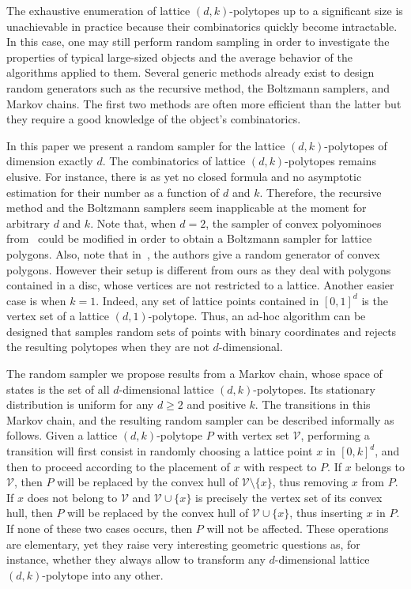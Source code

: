 \documentclass[a4paper]{article}
\begin{document}
The exhaustive enumeration of lattice $(d,k)$-polytopes up to a significant size is unachievable in practice because their combinatorics quickly become intractable. In this case, one may still perform random sampling in order to investigate the properties of typical large-sized objects and the average behavior of the algorithms applied to them. Several generic methods already exist to design random generators such as the recursive method, the Boltzmann samplers, and Markov chains. The first two methods are often more efficient than the latter but they require a good knowledge of the object's combinatorics.

In this paper we present a random sampler for the lattice $(d,k)$-polytopes of dimension exactly $d$. The combinatorics of lattice $(d,k)$-polytopes remains elusive. For instance, there is as yet no closed formula and no asymptotic estimation for their number as a function of $d$ and $k$. Therefore, the recursive method and the Boltzmann samplers seem inapplicable at the moment for arbitrary $d$ and $k$. Note that, when $d=2$, the sampler of convex polyominoes from~\cite{bodini2013asymptotic} could be modified in order to obtain a Boltzmann sampler for lattice polygons. Also, note that in~\cite{devillers2014generator}, the authors give a random generator of convex polygons. However their setup is different from ours as they deal with polygons contained in a disc, whose vertices are not restricted to a lattice. Another easier case is when $k=1$. Indeed, any set of lattice points contained in $[0,1]^d$ is the vertex set of a lattice $(d,1)$-polytope. Thus, an ad-hoc algorithm can be designed that samples random sets of points with binary coordinates and rejects the resulting polytopes when they are not $d$-dimensional.

The random sampler we propose results from a Markov chain, whose space of states is the set of all $d$-dimensional lattice $(d,k)$-polytopes. Its stationary distribution is uniform for any $d\geq{2}$ and positive $k$. The transitions in this Markov chain, and the resulting random sampler can be described informally as follows. Given a lattice $(d,k)$-polytope $P$ with vertex set $\mathcal{V}$, performing a transition will first consist in randomly choosing a lattice point $x$ in $[0,k]^d$, and then to proceed according to the placement of $x$ with respect to $P$. If $x$ belongs to $\mathcal{V}$, then $P$ will be replaced by the convex hull of $\mathcal{V}\mathord{\setminus}\{x\}$, thus removing $x$ from $P$. If $x$ does not belong to $\mathcal{V}$ and $\mathcal{V}\cup\{x\}$
is precisely the vertex set of its convex hull, then $P$ will be replaced by the convex hull of $\mathcal{V}\cup\{x\}$, thus inserting $x$ in $P$. If none of these two cases occurs, then $P$ will not be affected. These operations are elementary, yet they raise very interesting geometric questions as, for instance, whether they always allow to transform any $d$-dimensional lattice $(d,k)$-polytope into any other.
\end{document}
